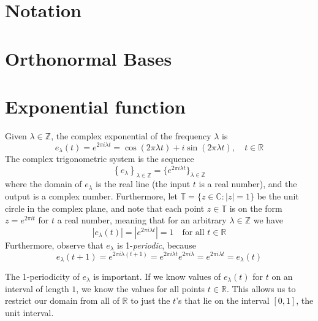 \documentclass[../thesis.tex]{subfiles}
\begin{document}
\section{Notation}
    

\section{Orthonormal Bases}
    


\section{Exponential function}
Given $\lambda \in \mathbb{Z}$, the complex exponential of the frequency $\lambda$ is 
\begin{equation}
    e_{\lambda}(t) = e^{2 \pi i \lambda t} = \cos{(2 \pi \lambda t)} + i \sin{(2 \pi \lambda t)}, \quad t\in \mathbb{R}    
\end{equation}
The complex trigonometric system is the sequence
\begin{equation}
    \left\{ e_{\lambda} \right\}_{\lambda\in \mathbb{Z}} = \{ e^{2 \pi i \lambda t} \}_{\lambda \in \mathbb{Z}}    
\end{equation}
where the domain of $e_\lambda$ is the real line (the input $t$ is a real number), and the output is a complex number. Furthermore, let $\mathbb{T}=\{z\in \mathbb{C} : |z|=1\}$ be the unit circle in the complex plane, and note that each point $z\in\mathbb{T}$ is on the form $z=e^{2 \pi i t}$ for $t$ a real number, meaning that for an arbitrary $\lambda \in \mathbb{Z}$ we have
\begin{equation}
    \left|e_{\lambda}(t) \right|= |e^{2 \pi i \lambda t} | = 1 \quad \text{for all } t\in \mathbb{R} 
\end{equation}
Furthermore, observe that $e_\lambda$ is 1-\emph{periodic}, because
\begin{equation}
    e_\lambda(t+1) = e^{2 \pi i \lambda (t+1)} = e^{2 \pi i \lambda t} e^{2 \pi i \lambda} = e^{2 \pi i \lambda t} = e_\lambda(t)
\end{equation}

The 1-periodicity of $e_\lambda$ is important. If we know values of $e_\lambda(t)$ for $t$ on an interval of length $1$, we know the values for all points $t\in \mathbb{R}$. This allows us to restrict our domain from all of $\mathbb{R}$ to just the $t$'s that lie on the interval $[0,1]$, the unit interval.
\end{document}
